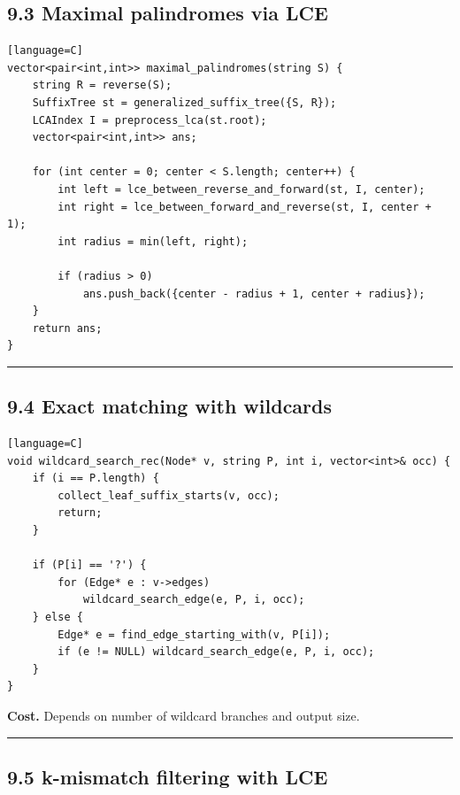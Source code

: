 \documentclass[11pt]{article}
\begin{document}
\subsection{9.3 Maximal palindromes via LCE}\label{maximal-palindromes-via-lce}

\begin{verbatim}[language=C]
vector<pair<int,int>> maximal_palindromes(string S) {
    string R = reverse(S);
    SuffixTree st = generalized_suffix_tree({S, R});
    LCAIndex I = preprocess_lca(st.root);
    vector<pair<int,int>> ans;

    for (int center = 0; center < S.length; center++) {
        int left = lce_between_reverse_and_forward(st, I, center);
        int right = lce_between_forward_and_reverse(st, I, center + 1);
        int radius = min(left, right);

        if (radius > 0)
            ans.push_back({center - radius + 1, center + radius});
    }
    return ans;
}
\end{verbatim}

\begin{center}\rule{0.5\linewidth}{0.5pt}\end{center}

\subsection{9.4 Exact matching with wildcards}\label{exact-matching-with-wildcards}

\begin{verbatim}[language=C]
void wildcard_search_rec(Node* v, string P, int i, vector<int>& occ) {
    if (i == P.length) {
        collect_leaf_suffix_starts(v, occ);
        return;
    }

    if (P[i] == '?') {
        for (Edge* e : v->edges)
            wildcard_search_edge(e, P, i, occ);
    } else {
        Edge* e = find_edge_starting_with(v, P[i]);
        if (e != NULL) wildcard_search_edge(e, P, i, occ);
    }
}
\end{verbatim}

\textbf{Cost.} Depends on number of wildcard branches and output size.

\begin{center}\rule{0.5\linewidth}{0.5pt}\end{center}

\subsection{9.5 k-mismatch filtering with LCE}\label{k-mismatch-filtering-with-lce}
\end{document}
